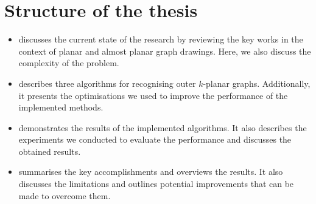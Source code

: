 \section{Structure of the thesis}

\begin{itemize}
    \item {} discusses the current state of the research by reviewing the key works in the context of planar and almost planar graph drawings. Here, we also discuss the complexity of the problem.
    \item {} describes three algorithms for recognising outer \(k\)-planar graphs. Additionally, it presents the optimisations we used to improve the performance of the implemented methods.
    \item {} demonstrates the results of the implemented algorithms. It also describes the experiments we conducted to evaluate the performance and discusses the obtained results.
    \item {} summarises the key accomplishments and overviews the results. It also discusses the limitations and outlines potential improvements that can be made to overcome them.
\end{itemize}